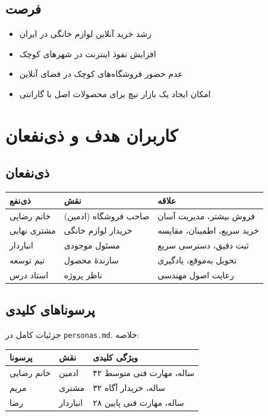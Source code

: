 \documentclass[12pt, a4paper]{article}
\begin{document}
\subsection{فرصت}
\begin{itemize}
    \item رشد خرید آنلاین لوازم خانگی در ایران
    \item افزایش نفوذ اینترنت در شهرهای کوچک
    \item عدم حضور فروشگاه‌های کوچک در فضای آنلاین
    \item امکان ایجاد یک بازار نیچ برای محصولات اصل با گارانتی
\end{itemize}

\section{کاربران هدف و ذی‌نفعان}

\subsection{ذی‌نفعان}
\begin{center}
\begin{tabular}{|l|l|p{5cm}|}
\hline
\textbf{ذی‌نفع} & \textbf{نقش} & \textbf{علاقه} \\
\hline
خانم رضایی & صاحب فروشگاه (ادمین) & فروش بیشتر، مدیریت آسان \\
\hline
مشتری نهایی & خریدار لوازم خانگی & خرید سریع، اطمینان، مقایسه \\
\hline
انباردار & مسئول موجودی & ثبت دقیق، دسترسی سریع \\
\hline
تیم توسعه & سازندهٔ محصول & تحویل به‌موقع، یادگیری \\
\hline
استاد درس & ناظر پروژه & رعایت اصول مهندسی \\
\hline
\end{tabular}
\end{center}

\subsection{پرسوناهای کلیدی}
جزئیات کامل در \texttt{personas.md}. خلاصه:
\begin{center}
\begin{tabular}{|l|l|l|}
\hline
\textbf{پرسونا} & \textbf{نقش} & \textbf{ویژگی کلیدی} \\
\hline
خانم رضایی & ادمین & ۴۲ ساله، مهارت فنی متوسط \\
\hline
مریم & مشتری & ۳۲ ساله، خریدار آگاه \\
\hline
رضا & انباردار & ۲۸ ساله، مهارت فنی پایین \\
\hline
\end{tabular}
\end{center}
\end{document}
